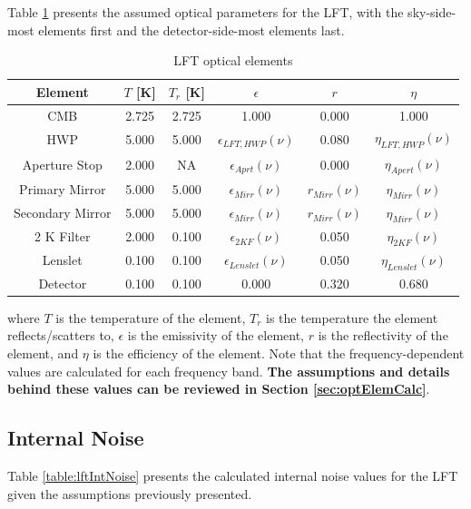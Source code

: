 \documentclass[12pt, titlepage]{article} %
\begin{document}
Table \ref{table:lftOptElems} presents the assumed optical parameters for the LFT, with the sky-side-most elements first and the detector-side-most elements last.

\begin{table}[H]
\centering
	\begin{tabular}{|| c | c | c | c | c | c ||}
	\hline
	Element & $T$ [K] & $T_{r}$ [K] & $\epsilon$ & $r$ & $\eta$ \\
	\hline
	\hline
	CMB & 2.725 & 2.725 & 1.000 & 0.000 & 1.000 \\
	\hline
	HWP & 5.000 & 5.000 & $\epsilon_{LFT,HWP} (\nu)$ & 0.080 & $\eta_{LFT,HWP} (\nu)$ \\
	\hline
	Aperture Stop & 2.000 & NA & $\epsilon_{Aprt} (\nu)$ & 0.000 & $\eta_{Apert} (\nu)$ \\
	\hline
	Primary Mirror & 5.000 & 5.000 & $\epsilon_{Mirr} (\nu)$ & $r_{Mirr} (\nu)$ & $\eta_{Mirr} (\nu)$ \\
	\hline
	Secondary Mirror & 5.000 & 5.000 & $\epsilon_{Mirr} (\nu)$ & $r_{Mirr} (\nu)$ & $\eta_{Mirr} (\nu)$ \\
	\hline
	2 K Filter & 2.000 & 0.100 & $\epsilon_{2KF} (\nu)$ & 0.050 & $\eta_{2KF} (\nu)$ \\
	\hline
	Lenslet & 0.100 & 0.100 & $\epsilon_{Lenslet} (\nu)$ & 0.050 & $\eta_{Lenslet} (\nu)$ \\
	\hline
	Detector & 0.100 & 0.100 & 0.000 & 0.320 & 0.680 \\
	\hline
	\end{tabular}
\caption{LFT optical elements \label{table:lftOptElems}}
\end{table}

where $T$ is the temperature of the element, $T_{r}$ is the temperature the element reflects/scatters to, $\epsilon$ is the emissivity of the element, $r$ is the reflectivity of the element, and $\eta$ is the efficiency of the element. Note that the frequency-dependent values are calculated for each frequency band. \textbf{The assumptions and details behind these values can be reviewed in Section \ref{sec:optElemCalc}}.


\subsection{Internal Noise}

Table \ref{table:lftIntNoise} presents the calculated internal noise values for the LFT given the assumptions previously presented.
\end{document}

